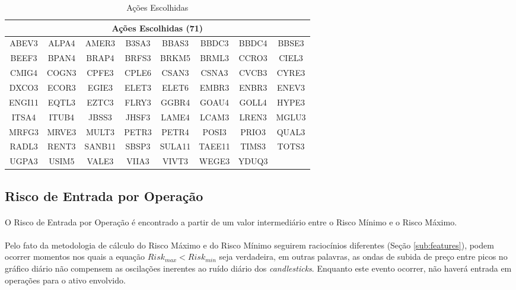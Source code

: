 \begin{table}[h!]
    \begin{center}
        \begin{tabular}{ cccccccc }
            \multicolumn{8}{c}{Ações Escolhidas (71)} \\
            \hline
            ABEV3 & ALPA4 & AMER3 & B3SA3 & BBAS3 & BBDC3 & BBDC4 & BBSE3 \\
            BEEF3 & BPAN4 & BRAP4 & BRFS3 & BRKM5 & BRML3 & CCRO3 & CIEL3 \\
            CMIG4 & COGN3 & CPFE3 & CPLE6 & CSAN3 & CSNA3 & CVCB3 & CYRE3 \\
            DXCO3 & ECOR3 & EGIE3 & ELET3 & ELET6 & EMBR3 & ENBR3 & ENEV3 \\
            ENGI11 & EQTL3 & EZTC3 & FLRY3 & GGBR4 & GOAU4 & GOLL4 & HYPE3 \\
            ITSA4 & ITUB4 & JBSS3 & JHSF3 & LAME4 & LCAM3 & LREN3 & MGLU3 \\
            MRFG3 & MRVE3 & MULT3 & PETR3 & PETR4 & POSI3 & PRIO3 & QUAL3 \\
            RADL3 & RENT3 & SANB11 & SBSP3 & SULA11 & TAEE11 & TIMS3 & TOTS3 \\
            UGPA3 & USIM5 & VALE3 & VIIA3 & VIVT3 & WEGE3 & YDUQ3
        \end{tabular}
        \caption{Ações Escolhidas}
        \label{tab:5}
    \end{center}
\end{table}



\FloatBarrier
\subsection{Risco de Entrada por Operação}
\label{sub:operation_risk}

\paragraph{} O Risco de Entrada por Operação é encontrado a partir de um valor intermediário entre o Risco Mínimo e o Risco Máximo.

\paragraph{} Pelo fato da metodologia de cálculo do Risco Máximo e do Risco Mínimo seguirem raciocínios diferentes (Seção \ref{sub:features}), podem ocorrer momentos nos quais a equação \begin{math} Risk_{max} < Risk_{min} \end{math} seja verdadeira, em outras palavras, as ondas de subida de preço entre picos no gráfico diário não compensem as oscilações inerentes ao ruído diário dos \textit{candlesticks}. Enquanto este evento ocorrer, não haverá entrada em operações para o ativo envolvido.


